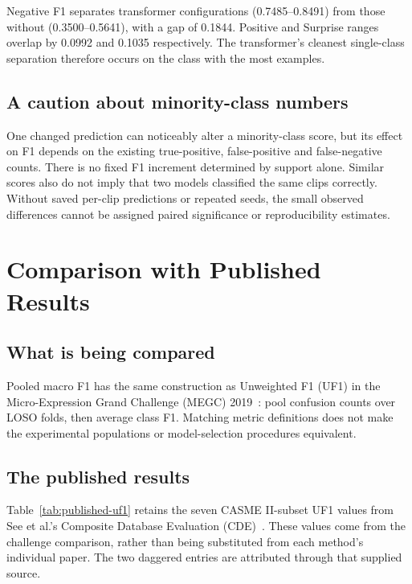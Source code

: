 Negative F1 separates transformer configurations (0.7485--0.8491) from those without (0.3500--0.5641), with a gap of 0.1844. Positive and Surprise ranges overlap by 0.0992 and 0.1035 respectively. The transformer's cleanest single-class separation therefore occurs on the class with the most examples.

\subsection{A caution about minority-class numbers}
\label{sec:minority-caution}

One changed prediction can noticeably alter a minority-class score, but its effect on F1 depends on the existing true-positive, false-positive and false-negative counts. There is no fixed F1 increment determined by support alone. Similar scores also do not imply that two models classified the same clips correctly. Without saved per-clip predictions or repeated seeds, the small observed differences cannot be assigned paired significance or reproducibility estimates.

\section{Comparison with Published Results}
\label{sec:literature-comparison}

\subsection{What is being compared}
\label{sec:what-compared}

Pooled macro F1 has the same construction as Unweighted F1 (UF1) in the Micro-Expression Grand Challenge (MEGC) 2019~\cite{see2019}: pool confusion counts over LOSO folds, then average class F1. Matching metric definitions does not make the experimental populations or model-selection procedures equivalent.

\subsection{The published results}
\label{sec:published-results}

Table~\ref{tab:published-uf1} retains the seven CASME II-subset UF1 values from See et al.'s Composite Database Evaluation (CDE)~\cite{see2019}. These values come from the challenge comparison, rather than being substituted from each method's individual paper. The two daggered entries are attributed through that supplied source.

